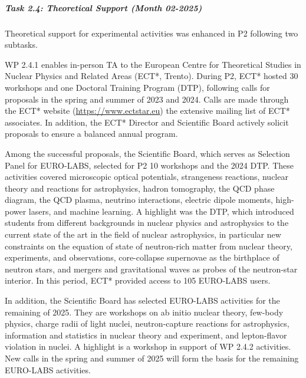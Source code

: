 \subparagraph{Task 2.4: Theoretical Support (Month 02-2025)} \mbox{}


Theoretical support for experimental activities was enhanced in P2 following two subtasks. 

WP 2.4.1 enables in-person TA to the European Centre for Theoretical Studies in Nuclear Physics and Related Areas (ECT*, Trento). During P2, ECT* hosted 30 workshops and one Doctoral Training Program (DTP), following calls for proposals in the spring and summer of  2023 and 2024. Calls are made through the ECT* website (\url{https://www.ectstar.eu}) the extensive mailing list of ECT* associates. In addition, the ECT* Director and Scientific Board actively solicit proposals to ensure a balanced annual program.

Among the successful proposals, the Scientific Board, which serves as Selection Panel for EURO-LABS, selected for P2 10 workshops and the 2024 DTP. These activities covered microscopic optical potentials, strangeness reactions, nuclear theory and reactions for astrophysics, hadron tomography, the QCD phase diagram, the QCD plasma, neutrino interactions, electric dipole moments, high-power lasers, and machine learning. A highlight was the DTP, which introduced students from different backgrounds in nuclear physics and astrophysics to the current state of the art in the field of nuclear astrophysics, in particular new constraints on the equation of state of neutron-rich matter from nuclear theory, experiments, and observations, core-collapse supernovae as the birthplace of neutron stars, and mergers and gravitational waves as probes of the neutron-star interior. In this period, ECT* provided access to 105 EURO-LABS users. 

In addition, the Scientific Board has selected EURO-LABS activities for the remaining of 2025. They are workshops on ab initio nuclear theory, few-body physics, charge radii of light nuclei, neutron-capture reactions for astrophysics, information and statistics in nuclear theory and experiment, and lepton-flavor violation in nuclei. A highlight is a workshop in support of WP 2.4.2 activities. New calls in the spring and summer of 2025 will form the basis for the remaining EURO-LABS activities.

